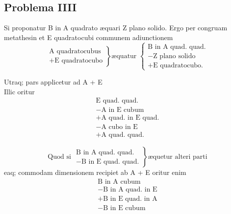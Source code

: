 \documentclass[11pt,a4paper]{article}
\begin{document}
\subsection*{Problema IIII}

Si proponatur B in A quadrato æquari Z plano solido. Ergo per congruam metathesin et E quadratocubi communem adiunctionem
\[ \left.\begin{array}{l} \text{A quadratocubus} \\ +\text{E quadratocubo} \end{array}\right\} \text{æquatur } \left\{\begin{array}{l} \text{B in A quad. quad.} \\ -\text{Z plano solido} \\ +\text{E quadratocubo.} \end{array}\right. \]

Utraq; pars applicetur ad A + E\\
Illic oritur
\[ \begin{array}{l} \text{E quad. quad.} \\ -\text{A in E cubum} \\ +\text{A quad. in E quad.} \\ -\text{A cubo in E} \\ +\text{A quad. quad.} \end{array} \]

\[ \text{Quod si } \left.\begin{array}{l} \text{B in A quad. quad.} \\ -\text{B in E quad. quad.} \end{array}\right\} \text{æquetur alteri parti} \]
eaq; commodam dimensionem recipiet ab A + E oritur enim
\[ \begin{array}{l} \text{B in A cubum} \\ -\text{B in A quad. in E} \\ +\text{B in E quad. in A} \\ -\text{B in E cubum} \end{array} \]
\end{document}
